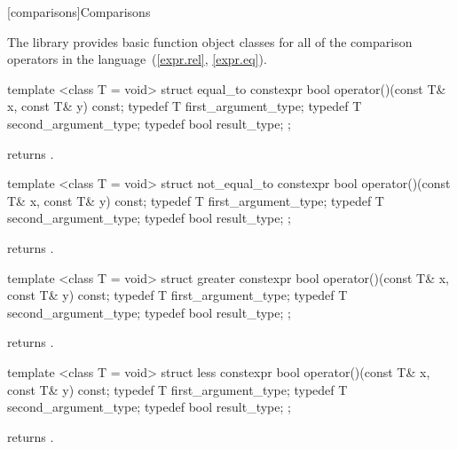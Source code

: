 [comparisons]{Comparisons}

\pnum
The library provides basic function object classes for all of the comparison
operators in the language~(\ref{expr.rel}, \ref{expr.eq}).

%
\begin{itemdecl}
template <class T = void> struct equal_to {
  constexpr bool operator()(const T& x, const T& y) const;
  typedef T first_argument_type;
  typedef T second_argument_type;
  typedef bool result_type;
};
\end{itemdecl}

\begin{itemdescr}
\pnum
{} returns .
\end{itemdescr}

%
\begin{itemdecl}
template <class T = void> struct not_equal_to {
  constexpr bool operator()(const T& x, const T& y) const;
  typedef T first_argument_type;
  typedef T second_argument_type;
  typedef bool result_type;
};
\end{itemdecl}

\begin{itemdescr}
\pnum
{} returns .
\end{itemdescr}

%
\begin{itemdecl}
template <class T = void> struct greater {
  constexpr bool operator()(const T& x, const T& y) const;
  typedef T first_argument_type;
  typedef T second_argument_type;
  typedef bool result_type;
};
\end{itemdecl}

\begin{itemdescr}
\pnum
{} returns .
\end{itemdescr}

%
\begin{itemdecl}
template <class T = void> struct less {
  constexpr bool operator()(const T& x, const T& y) const;
  typedef T first_argument_type;
  typedef T second_argument_type;
  typedef bool result_type;
};
\end{itemdecl}

\begin{itemdescr}
\pnum
{} returns .
\end{itemdescr}

